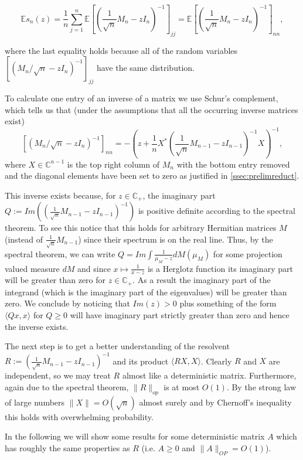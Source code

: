 \begin{equation}\label{eq:schursComplementForEs}
	\mathbb Es_n(z) = \frac{1}{n}\sum_{j=1}^n\mathbb E\left[\left(\frac{1}{\sqrt n}M_n-zI_n\right)^{-1}\right]_{jj}=\mathbb E\left[\left(\frac{1}{\sqrt n}M_n-zI_n\right)^{-1}\right]_{nn},
\end{equation}

where the last equality holds because all of the random variables $\left[(M_n/\sqrt n-zI_n)^{-1}\right]_{jj}$ have the same distribution.

To calculate one entry of an inverse of a matrix we use Schur's complement, which tells us that (under the assumptions that all the occurring inverse matrices exist) $$[(M_n/\sqrt n-zI_n)^{-1}]_{nn}=-\left(z+\frac{1}{n}X^*(\frac{1}{\sqrt n}M_{n-1}-zI_{n-1})^{-1}X\right)^{-1},$$ where $X\in\mathbb C^{n-1}$ is the top right column of $M_n$ with the bottom entry removed and the diagonal elements have been set to zero as justified in \ref{ssec:prelimreduct}.

This inverse exists because, for $z\in\mathbb C_+$, the imaginary part $Q:=Im\left((\frac{1}{\sqrt n}M_{n-1}-zI_{n-1})^{-1}\right)$ is positive definite according to the spectral theorem. To see this notice that this holds for arbitrary Hermitian matrices $M$ (instead of $\frac{1}{\sqrt n}M_{n-1}$) since their spectrum is on the real line. Thus, by the spectral theorem, we can write $Q=Im\int\frac{1}{\mu_M-z}dM(\mu_M)$ for some projection valued measure $dM$ and since $x\mapsto\frac{1}{x-z}$ is a Herglotz function its imaginary part will be greater than zero for $z\in\mathbb C_+$. As a result the imaginary part of the integrand (which is the imaginary part of the eigenvalues) will be greater than zero.
We conclude by noticing that $Im(z)>0$ plus something of the form $\langle Qx,x\rangle$ for $Q\geq 0$ will have imaginary part strictly greater than zero and hence the inverse exists.

The next step is to get a better understanding of the resolvent $R:=(\frac{1}{\sqrt n}M_{n-1}-zI_{n-1})^{-1}$ and its product $\langle RX,X\rangle$. Clearly $R$ and $X$ are independent, so we may treat $R$ almost like a deterministic matrix. Furthermore, again due to the spectral theorem, $\|R\|_{op}$ is at most $O(1)$. By the strong law of large numbers $\|X\|=O(\sqrt n)$ almost surely and by Chernoff's inequality this holds with overwhelming probability.

In the following we will show some results for some deterministic matrix $A$ which has roughly the same properties as $R$ (i.e. $A\geq 0$ and $\|A\|_{OP}=O(1)$).

